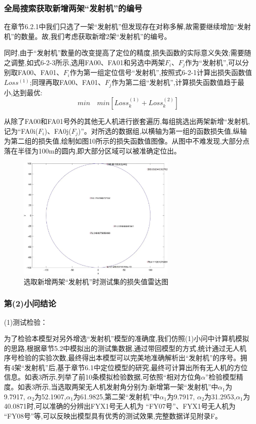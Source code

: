 \documentclass[withoutpreface,bwprint]{cumcmthesis}
\begin{document}
	\subsubsection{全局搜索获取新增两架“发射机”的编号}
	
	在章节6.2.1中我们只选了一架“发射机”但发现存在对称多解,故需要继续增加“发射机”的数量。故,我们考虑获取新增2架“发射机”的编号。
	
	同时,由于“发射机”数量的改变提高了定位的精度,损失函数的实际意义失效;需要随之调整,如式6-2-3所示,选用FA00、FA01和另选中两架$F_{i}$、$F_{j}$作为“发射机”,可以分别取FA00、FA01、$F_{i}$作为第一组定位信号“发射机”,按照式6-2-1计算出损失函数值$Loss^{(1)}$;同理再取FA00、FA01、$F_{j}$作为第二组“发射机”,计算损失函数值趋于最小,达到最优:
	\begin{equation}
		\tag{6-2-3}
		min \quad min[Loss^{(1)}_{k} + Loss^{(2)}_{k}]  
	\end{equation}
	
	从除了FA00和FA01号外的其他无人机进行嵌套遍历,每组挑选出两架新增“发射机,记为“FA0i($F_{i}$)、FA0j($F_{j}$)”。对所选的数据组,以横轴为第一组的函数损失值,纵轴为第二组的损失值,绘制如图10所示的损失函数值图像。从图中不难发现,大部分点落在半径为100m的圆内,即大部分区域可以被准确定位出。
	
	\begin{figure}[htbp!]
		\centering
		\includegraphics[height=6cm]{./figures/6-9.jpg}
		\caption{选取新增两架“发射机”时测试集的损失值雷达图}\label{fig:13}
	\end{figure}
	
	\subsubsection{第(2)小问结论}
	
	(1)测试检验：
	
	为了检验本模型对另外增选“发射机”模型的准确度,我们仿照(1)小问中计算机模拟的思路,根据章节5.2中模拟出的测试集数据,通过带回模型的方式,统计通过无人机序号检验的实验次数,最终得出本模型可以完美地准确解析出“发射机”的序号。拥有4架“发射机”后,基于章节6.1中定位模型的研究,最终可计算出所有无人机的方位信息。如表3所示,列举了前10条模拟检验数据,可依照“相对方位角$\alpha$”检验模型精度。如表3所示,当选取两架无人机发射角分别为:新增第一架“发射机”中$\alpha_{1}$为9.7917,	$\alpha_{2}$为52.1907,$\alpha_{1}$为61.9825,第二架“发射机”中$\alpha_{1}$为9.7917,	$\alpha_{2}$为31.2953,$\alpha_{1}$为40.0871时,可以准确的分辨出FYX1号无人机为 “FY07号”、FYX1号无人机为 “FY08号”等,可以反映出模型具有优秀的测试效果,完整数据详见附录F。
	
\end{document}
